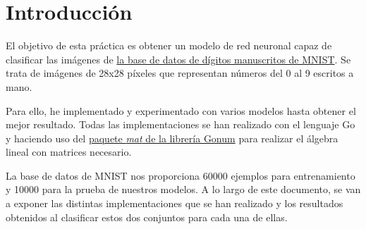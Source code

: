 \section{Introducción}
El objetivo de esta práctica es obtener un modelo de red neuronal capaz de clasificar las imágenes de \href{http://yann.lecun.com/exdb/mnist/}{la base de datos de dígitos manuscritos de MNIST}. Se trata de imágenes de 28x28 píxeles que representan números del 0 al 9 escritos a mano.

Para ello, he implementado y experimentado con varios modelos hasta obtener el mejor resultado. Todas las implementaciones se han realizado con el lenguaje Go y haciendo uso del \href{https://godoc.org/gonum.org/v1/gonum/mat}{paquete \textit{mat} de la librería Gonum} para realizar el álgebra lineal con matrices necesario.

La base de datos de MNIST nos proporciona 60000 ejemplos para entrenamiento y 10000 para la prueba de nuestros modelos. A lo largo de este documento, se van a exponer las distintas implementaciones que se han realizado y los resultados obtenidos al clasificar estos dos conjuntos para cada una de ellas.